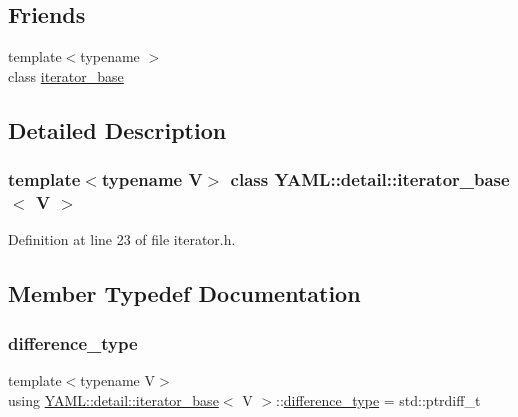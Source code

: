 \subsection*{Friends}
\begin{DoxyCompactItemize}
\item 
{\footnotesize template$<$typename $>$ }\\class \mbox{\hyperlink{class_y_a_m_l_1_1detail_1_1iterator__base_ab1930cc139d6cbbc031a52082e142122}{iterator\+\_\+base}}
\end{DoxyCompactItemize}


\subsection{Detailed Description}
\subsubsection*{template$<$typename V$>$\newline
class Y\+A\+M\+L\+::detail\+::iterator\+\_\+base$<$ V $>$}



Definition at line 23 of file iterator.\+h.



\subsection{Member Typedef Documentation}
\mbox{\label{class_y_a_m_l_1_1detail_1_1iterator__base_a54a83cdcf34a0ca929bf41be84da866e}} 
\subsubsection{\texorpdfstring{difference\_type}{difference\_type}}
{\footnotesize\ttfamily template$<$typename V$>$ \\
using \mbox{\hyperlink{class_y_a_m_l_1_1detail_1_1iterator__base}{Y\+A\+M\+L\+::detail\+::iterator\+\_\+base}}$<$ V $>$\+::\mbox{\hyperlink{class_y_a_m_l_1_1detail_1_1iterator__base_a54a83cdcf34a0ca929bf41be84da866e}{difference\+\_\+type}} =  std\+::ptrdiff\+\_\+t}



